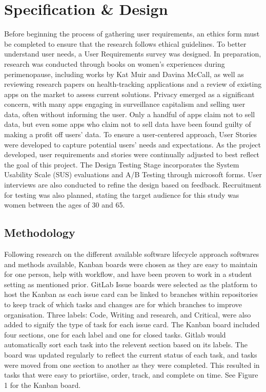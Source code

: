 
\section{Specification \& Design}\label{process}

Before beginning the process of gathering user requirements, an ethics form must be completed to ensure that the research follows ethical guidelines. To better understand user needs, a User Requirements survey was designed. In preparation, research was conducted through books on women’s experiences during perimenopause, including works by Kat Muir and Davina McCall, as well as reviewing research papers on health-tracking applications and a review of existing apps on the market to assess current solutions. Privacy emerged as a significant concern, with many apps engaging in surveillance capitalism and selling user data, often without informing the user. Only a handful of apps claim not to sell data, but even some apps who claim not to sell data have been found guilty of making a profit off users' data. To ensure a user-centered approach, User Stories were developed to capture potential users’ needs and expectations. As the project developed, user requirements and stories were continually adjusted to best reflect the goal of this project. The Design Testing Stage incorporates the System Usability Scale (SUS) evaluations and A/B Testing through microsoft forms. User interviews are also conducted to refine the design based on feedback. Recruitment for testing was also planned, stating the target audience for this study was women between the ages of 30 and 65.

\subsection{Methodology}
Following research on the different available software lifecycle approach softwares and methods available, Kanban boards were chosen as they are easy to maintain for one person, help with workflow, and have been proven to work in a student setting as mentioned prior. GitLab Issue boards were selected as the platform to host the Kanban as each issue card can be linked to branches within repositories to keep track of which tasks and changes are for which branches to improve organisation. Three labels: Code, Writing and research, and Critical, were also added to signify the type of task for each issue card. The Kanban board included four sections, one for each label and one for closed tasks. Gitlab would automatically sort each task into the relevent section based on its labels. The board was updated regularly to reflect the current status of each task, and tasks were moved from one section to another as they were completed. This resulted in tasks that were easy to priortiise, order, track, and complete on time. See Figure 1 for the Kanban board.

